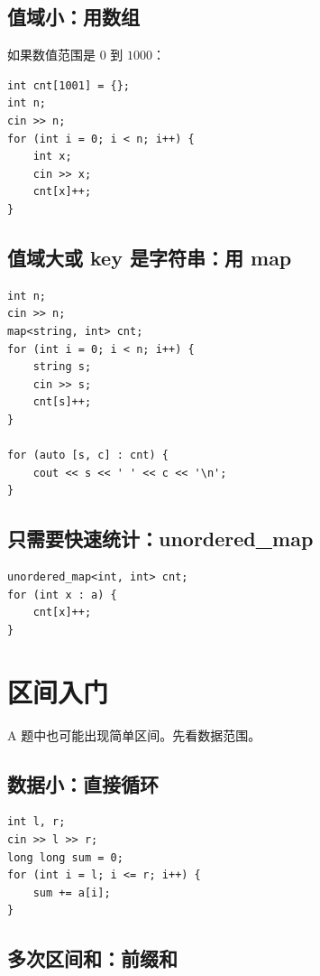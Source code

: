 \subsection{值域小：用数组}

如果数值范围是 $0$ 到 $1000$：

\begin{lstlisting}
int cnt[1001] = {};
int n;
cin >> n;
for (int i = 0; i < n; i++) {
    int x;
    cin >> x;
    cnt[x]++;
}
\end{lstlisting}

\subsection{值域大或 key 是字符串：用 map}

\begin{lstlisting}
int n;
cin >> n;
map<string, int> cnt;
for (int i = 0; i < n; i++) {
    string s;
    cin >> s;
    cnt[s]++;
}

for (auto [s, c] : cnt) {
    cout << s << ' ' << c << '\n';
}
\end{lstlisting}

\subsection{只需要快速统计：unordered\_map}

\begin{lstlisting}
unordered_map<int, int> cnt;
for (int x : a) {
    cnt[x]++;
}
\end{lstlisting}


\section{区间入门}\label{sec:05-19}

A 题中也可能出现简单区间。先看数据范围。

\subsection{数据小：直接循环}

\begin{lstlisting}
int l, r;
cin >> l >> r;
long long sum = 0;
for (int i = l; i <= r; i++) {
    sum += a[i];
}
\end{lstlisting}

\subsection{多次区间和：前缀和}

